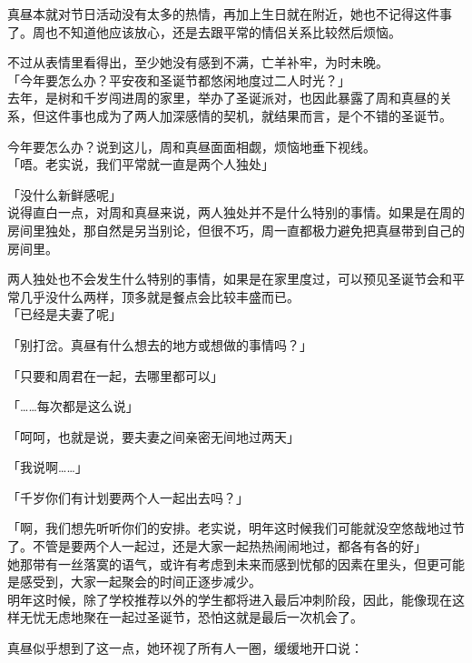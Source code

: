 真昼本就对节日活动没有太多的热情，再加上生日就在附近，她也不记得这件事了。周也不知道他应该放心，还是去跟平常的情侣关系比较然后烦恼。

不过从表情里看得出，至少她没有感到不满，亡羊补牢，为时未晚。\\

「今年要怎么办？平安夜和圣诞节都悠闲地度过二人时光？」\\

去年，是树和千岁闯进周的家里，举办了圣诞派对，也因此暴露了周和真昼的关系，但这件事也成为了两人加深感情的契机，就结果而言，是个不错的圣诞节。


今年要怎么办？说到这儿，周和真昼面面相觑，烦恼地垂下视线。\\


「唔。老实说，我们平常就一直是两个人独处」


「没什么新鲜感呢」\\


说得直白一点，对周和真昼来说，两人独处并不是什么特别的事情。如果是在周的房间里独处，那自然是另当别论，但很不巧，周一直都极力避免把真昼带到自己的房间里。


两人独处也不会发生什么特别的事情，如果是在家里度过，可以预见圣诞节会和平常几乎没什么两样，顶多就是餐点会比较丰盛而已。\\


「已经是夫妻了呢」


「别打岔。真昼有什么想去的地方或想做的事情吗？」


「只要和周君在一起，去哪里都可以」


「……每次都是这么说」

「呵呵，也就是说，要夫妻之间亲密无间地过两天」

「我说啊……」

「千岁你们有计划要两个人一起出去吗？」

「啊，我们想先听听你们的安排。老实说，明年这时候我们可能就没空悠哉地过节了。不管是要两个人一起过，还是大家一起热热闹闹地过，都各有各的好」\\

她那带有一丝落寞的语气，或许有考虑到未来而感到忧郁的因素在里头，但更可能是感受到，大家一起聚会的时间正逐步减少。\\

明年这时候，除了学校推荐以外的学生都将进入最后冲刺阶段，因此，能像现在这样无忧无虑地聚在一起过圣诞节，恐怕这就是最后一次机会了。

真昼似乎想到了这一点，她环视了所有人一圈，缓缓地开口说：\\

